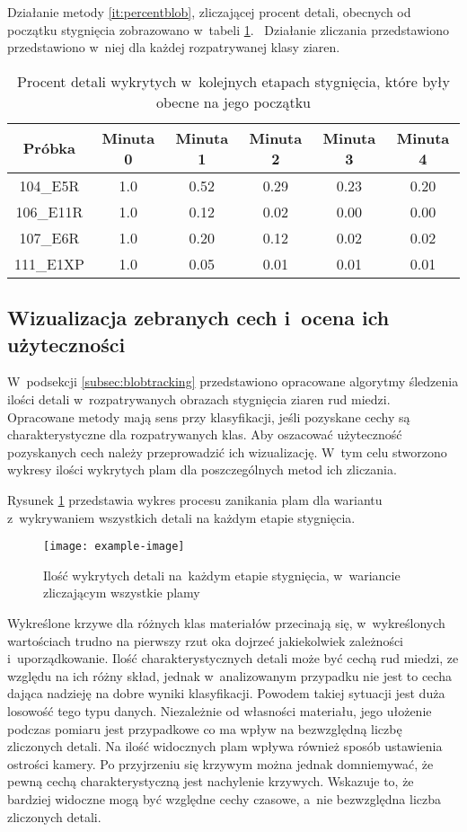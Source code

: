Działanie metody \ref{it:percentblob}, zliczającej procent detali, obecnych
od początku stygnięcia zobrazowano w~tabeli \ref{tab:blobpercent}.~
Działanie zliczania przedstawiono przedstawiono w~niej dla każdej 
rozpatrywanej klasy ziaren.
\begin{table}[htbp]
	\centering
	\begin{tabular}{c|c|c|c|c|c}
	\toprule
	Próbka & Minuta 0 & Minuta 1 & Minuta 2 & Minuta 3 & Minuta 4 \\ \midrule
	104\_E5R  & 1.0 & 0.52 & 0.29 & 0.23 & 0.20 \\
	106\_E11R & 1.0 & 0.12 & 0.02 & 0.00 & 0.00 \\
	107\_E6R  & 1.0 & 0.20 & 0.12 & 0.02 & 0.02 \\
	111\_E1XP & 1.0 & 0.05 & 0.01 & 0.01 & 0.01 \\
	\bottomrule
	\end{tabular}
\caption{Procent detali wykrytych w~kolejnych etapach stygnięcia, które
         były obecne na jego początku}
\label{tab:blobpercent}
\end{table}

\subsection{Wizualizacja zebranych cech i~ocena ich użyteczności}
\label{subsec:datavis}
W~podsekcji \ref{subsec:blobtracking} przedstawiono opracowane algorytmy
śledzenia ilości detali w~rozpatrywanych obrazach stygnięcia ziaren rud
miedzi.
Opracowane metody mają sens przy klasyfikacji, jeśli pozyskane cechy są
charakterystyczne dla rozpatrywanych klas.
Aby oszacować użyteczność pozyskanych cech należy przeprowadzić ich
wizualizację.
W~tym celu stworzono wykresy ilości wykrytych plam dla poszczególnych
metod ich zliczania.

Rysunek \ref{fig:blobchartall} przedstawia wykres procesu zanikania plam dla
wariantu z~wykrywaniem wszystkich detali na każdym etapie stygnięcia.
\begin{figure}[htbp]
    \centering
    \texttt{[image: example-image]}
    \caption{Ilość wykrytych detali na~każdym etapie stygnięcia, w~wariancie
             zliczającym wszystkie plamy}
    \label{fig:blobchartall}
\end{figure}
Wykreślone krzywe dla różnych klas materiałów przecinają się, w~wykreślonych
wartościach trudno na pierwszy rzut oka dojrzeć jakiekolwiek zależności
i~uporządkowanie.
Ilość charakterystycznych detali może być cechą rud miedzi, ze względu na
ich różny skład, jednak w~analizowanym przypadku nie jest to cecha dająca
nadzieję na dobre wyniki klasyfikacji.
Powodem takiej sytuacji jest duża losowość tego typu danych.
Niezależnie od własności materiału, jego ułożenie podczas pomiaru jest
przypadkowe co ma wpływ na bezwzględną liczbę zliczonych detali.
Na ilość widocznych plam wpływa również sposób ustawienia ostrości kamery.
Po przyjrzeniu się krzywym można jednak domniemywać, że pewną cechą
charakterystyczną jest nachylenie krzywych.
Wskazuje to, że bardziej widoczne mogą być względne cechy czasowe, a~nie
bezwzględna liczba zliczonych detali.

